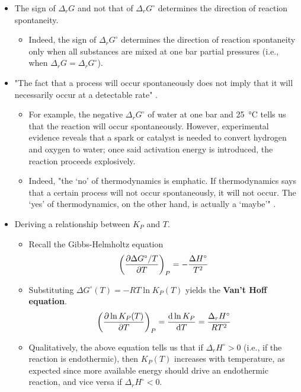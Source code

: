 \documentclass[../notes.tex]{subfiles}
\begin{document}
\begin{itemize}
    \item The sign of $\Delta_rG$ and not that of $\Delta_rG^\circ$ determines the direction of reaction spontaneity.
    \begin{itemize}
        \item Indeed, the sign of $\Delta_rG^\circ$ determines the direction of reaction spontaneity only when all substances are mixed at one bar partial pressures (i.e., when $\Delta_rG=\Delta_rG^\circ$).
    \end{itemize}
    \item "The fact that a process will occur spontaneously does not imply that it will necessarily occur at a detectable rate" \parencite[977]{bib:McQuarrieSimon}.
    \begin{itemize}
        \item For example, the negative $\Delta_rG^\circ$ of water at one bar and \SI{25}{\celsius} tells us that the reaction  will occur spontaneously. However, experimental evidence reveals that a spark or catalyst is needed to convert hydrogen and oxygen to water; once said activation energy is introduced, the reaction proceeds explosively.
        \item Indeed, "the `no' of thermodynamics is emphatic. If thermodynamics says that a certain process will not occur spontaneously, it will not occur. The `yes' of thermodynamics, on the other hand, is actually a `maybe'" \parencite[977]{bib:McQuarrieSimon}.
    \end{itemize}
    \item {}Deriving a relationship between $K_P$ and $T$.
    \begin{itemize}
        \item Recall the Gibbs-Helmholtz equation
        \begin{equation*}
            \left( \pdv{\Delta G^\circ/T}{T} \right)_P = -\frac{\Delta H^\circ}{T^2}
        \end{equation*}
        \item Substituting $\Delta G^\circ(T)=-RT\ln K_P(T)$ yields the \textbf{Van't Hoff equation}.
        \begin{equation*}
            \left( \pdv{\ln K_P(T)}{T} \right)_P = \dv{\ln K_P}{T}
            = \frac{\Delta_rH^\circ}{RT^2}
        \end{equation*}
        \item Qualitatively, the above equation tells us that if $\Delta_rH^\circ>0$ (i.e., if the reaction is endothermic), then $K_P(T)$ increases with temperature, as expected since more available energy should drive an endothermic reaction, and vice versa if $\Delta_rH^\circ<0$.

\end{itemize}
\end{itemize}
\end{document}
